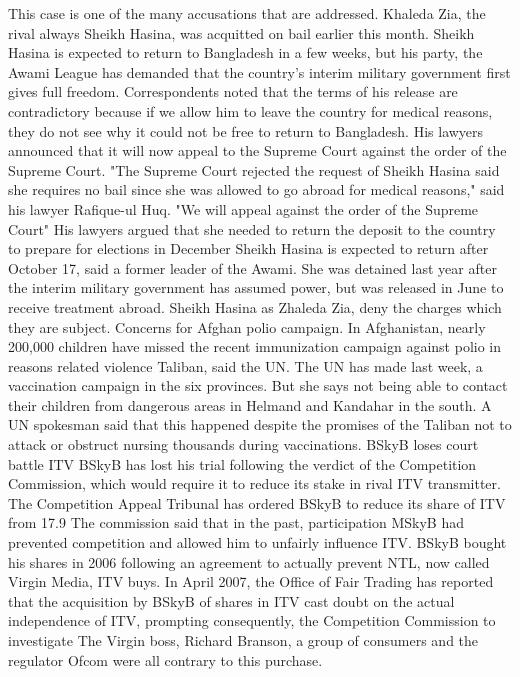This case is one of the many accusations that are addressed.
Khaleda Zia, the rival always Sheikh Hasina, was acquitted on bail earlier this month.
Sheikh Hasina is expected to return to Bangladesh in a few weeks, but his party, the Awami League has demanded that the country's interim military government first gives full freedom.
Correspondents noted that the terms of his release are contradictory because if we allow him to leave the country for medical reasons, they do not see why it could not be free to return to Bangladesh.
His lawyers announced that it will now appeal to the Supreme Court against the order of the Supreme Court.
"The Supreme Court rejected the request of Sheikh Hasina said she requires no bail since she was allowed to go abroad for medical reasons," said his lawyer Rafique-ul Huq.
"We will appeal against the order of the Supreme Court"
His lawyers argued that she needed to return the deposit to the country to prepare for elections in December
Sheikh Hasina is expected to return after October 17, said a former leader of the Awami.
She was detained last year after the interim military government has assumed power, but was released in June to receive treatment abroad.
Sheikh Hasina as Zhaleda Zia, deny the charges which they are subject.
Concerns for Afghan polio campaign.
In Afghanistan, nearly 200,000 children have missed the recent immunization campaign against polio in reasons related violence Taliban, said the UN.
The UN has made last week, a vaccination campaign in the six provinces.
But she says not being able to contact their children from dangerous areas in Helmand and Kandahar in the south.
A UN spokesman said that this happened despite the promises of the Taliban not to attack or obstruct nursing thousands during vaccinations.
BSkyB loses court battle ITV
BSkyB has lost his trial following the verdict of the Competition Commission, which would require it to reduce its stake in rival ITV transmitter.
The Competition Appeal Tribunal has ordered BSkyB to reduce its share of ITV from 17.9%
The commission said that in the past, participation MSkyB had prevented competition and allowed him to unfairly influence ITV.
BSkyB bought his shares in 2006 following an agreement to actually prevent NTL, now called Virgin Media, ITV buys.
In April 2007, the Office of Fair Trading has reported that the acquisition by BSkyB of shares in ITV cast doubt on the actual independence of ITV, prompting consequently, the Competition Commission to investigate
The Virgin boss, Richard Branson, a group of consumers and the regulator Ofcom were all contrary to this purchase.
